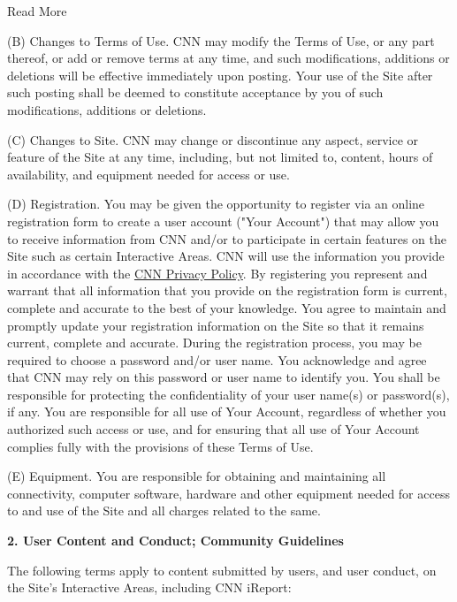 Read More

(B) Changes to Terms of Use. CNN may modify the Terms of Use, or any
part thereof, or add or remove terms at any time, and such
modifications, additions or deletions will be effective immediately upon
posting. Your use of the Site after such posting shall be deemed to
constitute acceptance by you of such modifications, additions or
deletions.

(C) Changes to Site. CNN may change or discontinue any aspect, service
or feature of the Site at any time, including, but not limited to,
content, hours of availability, and equipment needed for access or use.

(D) Registration. You may be given the opportunity to register via an
online registration form to create a user account ("Your Account") that
may allow you to receive information from CNN and/or to participate in
certain features on the Site such as certain Interactive Areas. CNN will
use the information you provide in accordance with the
\href{http://www.cnn.com/privacy}{CNN Privacy Policy}. By registering
you represent and warrant that all information that you provide on the
registration form is current, complete and accurate to the best of your
knowledge. You agree to maintain and promptly update your registration
information on the Site so that it remains current, complete and
accurate. During the registration process, you may be required to choose
a password and/or user name. You acknowledge and agree that CNN may rely
on this password or user name to identify you. You shall be responsible
for protecting the confidentiality of your user name(s) or password(s),
if any. You are responsible for all use of Your Account, regardless of
whether you authorized such access or use, and for ensuring that all use
of Your Account complies fully with the provisions of these Terms of
Use.

(E) Equipment. You are responsible for obtaining and maintaining all
connectivity, computer software, hardware and other equipment needed for
access to and use of the Site and all charges related to the same.

\textbf{2. User Content and Conduct; Community Guidelines}

The following terms apply to content submitted by users, and user
conduct, on the Site's Interactive Areas, including CNN iReport:

